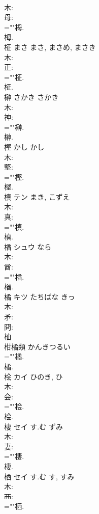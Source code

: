 \documentclass[8pt]{extreport}
\begin{document}
\begin{CJK}{UTF8}{min}
\\	木: 
\\	母: 
\\	=""栂.
\\	栂.
\\	柾	まさ	まさ, まさめ, まさき		
\\	木: 
\\	正: 
\\	=""柾.
\\	柾.
\\	榊	さかき	さかき		
\\	木: 
\\	神: 
\\	=""榊.
\\	榊.
\\	樫	かし	かし		
\\	木: 
\\	堅: 
\\	=""樫.
\\	樫.
\\	槙	テン	まき, こずえ		
\\	木: 
\\	真: 
\\	=""槙.
\\	槙.
\\	楢	シュウ	なら		
\\	木: 
\\	酋: 
\\	=""楢.
\\	楢.
\\	橘	キツ	たちばな	きっ	
\\	木: 
\\	矛: 
\\	冏: 
\\	柚 
\\	柑橘類 かんきつるい 
\\	=""橘.
\\	橘.
\\	桧	カイ	ひのき, ひ		
\\	木: 
\\	会: 
\\	=""桧.
\\	桧.
\\	棲	セイ	す.む	ずみ	
\\	木: 
\\	妻: 
\\	=""棲.
\\	棲.
\\	栖	セイ	す.む	す, すみ	
\\	木: 
\\	襾: 
\\	=""栖.

\end{CJK}
\end{document}
